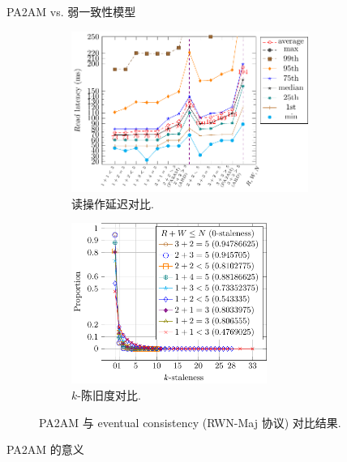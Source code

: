\begin{frame}{PA2AM vs. 弱一致性模型}
  \begin{figure}
	\begin{subfigure}{0.50\textwidth}
	  \centering
	  \includegraphics[width = 0.85\textwidth]{figures/rwn-2am-read-latency-quantiles.pdf}
	  \caption{读操作延迟对比.}
	\end{subfigure}%
	\begin{subfigure}{0.50\textwidth}
	  \centering
	  \includegraphics[width = 0.70\textwidth]{figures/rwn-maj.pdf}
	  \caption{$k$-陈旧度对比.}
	\end{subfigure}
	\caption{PA2AM 与 eventual consistency (RWN-Maj 协议) 对比结果.}
  \end{figure}

  \vspace{-0.50cm}
  
\end{frame}
\begin{frame}{PA2AM 的意义}
\end{frame}
